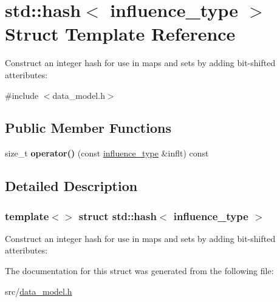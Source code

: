 \hypertarget{structstd_1_1hash_3_01influence__type_01_4}{}\section{std\+:\+:hash$<$ influence\+\_\+type $>$ Struct Template Reference}
\label{structstd_1_1hash_3_01influence__type_01_4}


Construct an integer hash for use in maps and sets by adding bit-\/shifted atteributes\+:  




{\ttfamily \#include $<$data\+\_\+model.\+h$>$}

\subsection*{Public Member Functions}
\begin{DoxyCompactItemize}
\item 
\mbox{\label{structstd_1_1hash_3_01influence__type_01_4_a239c71c12f554f09d7711c188ea7774f}} 
size\+\_\+t {\bfseries operator()} (const \hyperlink{structtricl_1_1influence__type}{influence\+\_\+type} \&inflt) const
\end{DoxyCompactItemize}


\subsection{Detailed Description}
\subsubsection*{template$<$$>$\newline
struct std\+::hash$<$ influence\+\_\+type $>$}

Construct an integer hash for use in maps and sets by adding bit-\/shifted atteributes\+: 

The documentation for this struct was generated from the following file\+:\begin{DoxyCompactItemize}
\item 
src/\hyperlink{data__model_8h}{data\+\_\+model.\+h}\end{DoxyCompactItemize}
